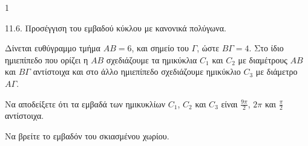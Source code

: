 \begin{ylh}{1}
    \item 11.6. Προσέγγιση του εμβαδού κύκλου με κανονικά πολύγωνα.
\end{ylh}
\begin{figure}
\centering
{}
\end{figure}
Δίνεται ευθύγραμμο τμήμα $AB = 6$, και σημείο του $\Gamma$, ώστε $B\Gamma = 4$. Στο ίδιο ημιεπίπεδο που ορίζει η $AB$ σχεδιάζουμε τα ημικύκλια $C_1$ και $C_2$ με διαμέτρους $AB$ και $B\Gamma$ αντίστοιχα και στο άλλο ημιεπίπεδο σχεδιάζουμε ημικύκλιο $C_3$ με διάμετρο $A\Gamma$.
\begin{alist}
\item Να αποδείξετε ότι τα εμβαδά των ημικυκλίων $C_1$, $C_2$ και $C_3$ είναι $\frac{9\pi}{2}$, $2\pi$ και $\frac{\pi}{2}$ αντίστοιχα. 
\item Να βρείτε το εμβαδόν του σκιασμένου χωρίου. 
\end{alist}